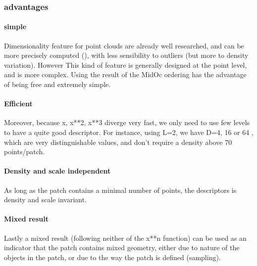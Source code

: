 			 	
		\subsubsection{advantages}
			\paragraph{simple}
				Dimensionality feature for point clouds are already well researched, and can be more precisely computed (\cite{Demantke2014}), with less sensibility to outliers (but more to density variation). However This kind of feature is generally designed at the point level, and is more complex.
				Using the result of the MidOc ordering has the advantage of being free and extremely simple. 
			\paragraph{Efficient}
				Moreover, because x, x**2, x**3 diverge very fast, we only need to use few levels to have a quite good descriptor. For instance, using L=2, we have D=4, 16 or 64 , which are very distinguishable values, and don't require a density above 70 points/patch. 
			\paragraph{Density and scale independent}
				As long as the patch contains a minimal number of points, the descriptors is density and scale invariant.
			\paragraph{Mixed result}
				Lastly a mixed result (following neither of the x**n function) can be used as an indicator that the patch contains mixed geometry, either due to nature of the objects in the patch, or due to the way the patch is defined (sampling).
				
			
			
		
		
		

